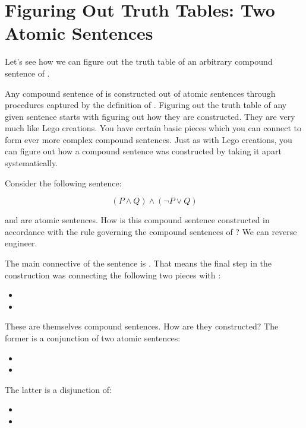  \section{Figuring Out Truth Tables: Two Atomic Sentences}

 Let's see how we can figure out the truth table of an arbitrary compound 
 sentence of \lL{}.

 Any compound sentence of \lL{} is constructed out of atomic sentences through 
 procedures captured by the definition of \lL{}. Figuring out the truth table of 
 any given sentence starts with figuring out how they are constructed.  They are 
 very much like Lego creations. You have certain basic pieces which you can 
 connect to form ever more complex compound sentences. Just as with Lego 
 creations, you can figure out how a compound sentence was constructed by taking 
 it apart systematically. 

 Consider the following sentence:

 $$ (P\land Q) \land (\lnot P \lor Q) $$

  and  are atomic sentences. How is this compound sentence constructed 
 in accordance with the rule governing the compound sentences of \lL{}?  We can 
 reverse engineer.  
 
 The main connective of the sentence is \land.  That means the final step in the 
 construction was connecting the following two pieces with \p{\land}:
 
 \begin{itemize}

  \item {}

  \item {}

 \end{itemize}

 These are themselves compound sentences. How are they constructed? The former 
 is a conjunction of two atomic sentences:

 \begin{itemize}

  \item {}

  \item {}

 \end{itemize}

The latter is a disjunction of:

\begin{itemize}

 \item {}

 \item {}

\end{itemize}

